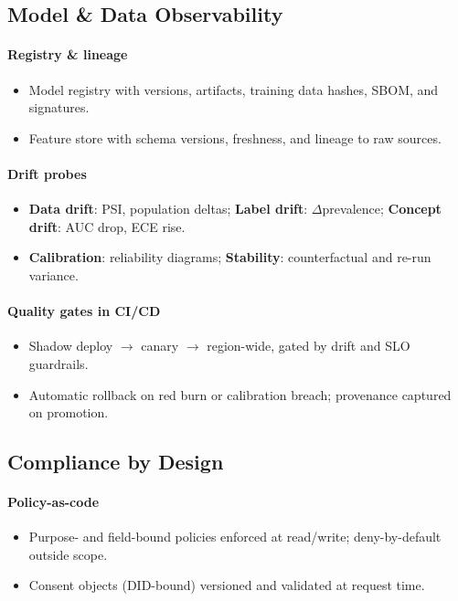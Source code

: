 \documentclass[11pt]{article}
\theoremstyle{plain}
\begin{document}
\subsection{Model \& Data Observability}
\paragraph{Registry \& lineage}
\begin{itemize}
  \item Model registry with versions, artifacts, training data hashes, SBOM, and signatures.
  \item Feature store with schema versions, freshness, and lineage to raw sources.
\end{itemize}

\paragraph{Drift probes}
\begin{itemize}
  \item \textbf{Data drift}: PSI, population deltas; \textbf{Label drift}: $\Delta$prevalence; \textbf{Concept drift}: AUC drop, ECE rise.
  \item \textbf{Calibration}: reliability diagrams; \textbf{Stability}: counterfactual and re-run variance.
\end{itemize}

\paragraph{Quality gates in CI/CD}
\begin{itemize}
  \item Shadow deploy $\rightarrow$ canary $\rightarrow$ region-wide, gated by drift and SLO guardrails.
  \item Automatic rollback on red burn or calibration breach; provenance captured on promotion.
\end{itemize}

\subsection{Compliance by Design}
\paragraph{Policy-as-code}
\begin{itemize}
  \item Purpose- and field-bound policies enforced at read/write; deny-by-default outside scope.
  \item Consent objects (DID-bound) versioned and validated at request time.
\end{itemize}
\end{document}

